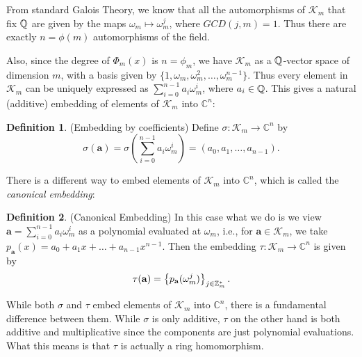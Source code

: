\documentclass[12pt]{article}
\theoremstyle{plain}
\theoremstyle{definition}
\newtheorem{definition}{Definition}
\theoremstyle{remark}
\begin{document}
From standard Galois Theory, we know that all the automorphisms of $\mathcal{K}_m$ that fix $\mathbb{Q}$ are given by the maps $\omega_m \mapsto \omega_m^j$, where $GCD(j,m)=1$. Thus there are exactly $n=\phi(m)$ automorphisms of the field.

Also, since the degree of $\Phi_m(x)$ is $n=\phi_m$, we have $\mathcal{K}_m$ as a $\mathbb{Q}$-vector space of dimension $m$, with a basis given by $\{1, \omega_m, \omega_m^2, \dots, \omega_m^{n-1}\}$. Thus every element in $\mathcal{K}_m$ can be uniquely expressed as $\sum_{i=0}^{n-1}a_i\omega_m^i$, where $a_i \in \mathbb{Q}$. This gives a natural (additive) embedding of elements of $\mathcal{K}_m$ into $\mathbb{C}^n$:

\begin{definition}(Embedding by coefficients)
Define $\sigma:\mathcal{K}_m \rightarrow \mathbb{C}^n$ by
$$\sigma(\mathbf{a}) = \sigma \left (\sum_{i=0}^{n-1}a_i\omega_m^i\right ) = (a_0, a_1, \dots, a_{n-1}).$$
\end{definition}

There is a different way to embed elements of $\mathcal{K}_m$ into $\mathbb{C}^n$, which is called the {\it canonical embedding}:
\begin{definition} (Canonical Embedding)
In this case what we do is we view $\mathbf{a} = \sum_{i=0}^{n-1}a_i\omega_m^i$ as a polynomial evaluated at $\omega_m$, i.e., for $\mathbf{a} \in \mathcal{K}_m$, we take
$p_{\mathbf{a}}(x) =a_0+a_1x+\dots +a_{n-1}x^{n-1}$. Then the embedding $\tau:\mathcal{K}_m \rightarrow \mathbb{C}^n$ is given by
$$\tau(\mathbf{a}) = \left \{p_{\mathbf{a}}(\omega_m^j)\right\}_{j\in \mathbb{Z}_m^*}.$$
\end{definition}

While both $\sigma$ and $\tau$ embed elements of $\mathcal{K}_m$ into $\mathbb{C}^n$, there is a fundamental difference between them.
While $\sigma$ is only additive, $\tau$ on the other hand is both additive and multiplicative since the components are just polynomial evaluations. What this means is that $\tau$ is actually a ring homomorphism.
\end{document}
